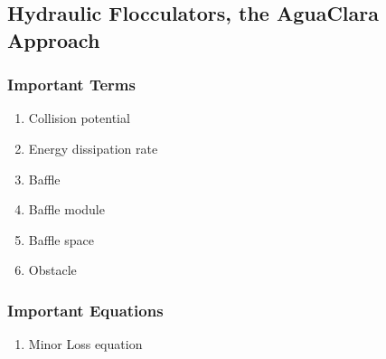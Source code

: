 \documentclass[letterpaper,10pt,english]{sphinxmanual}
\begin{document}
\subsection{Hydraulic Flocculators, the AguaClara Approach}
\label{\detokenize{Flocculation/Floc_Design:hydraulic-flocculators-the-aguaclara-approach}}

\subsubsection{Important Terms}
\label{\detokenize{Flocculation/Floc_Design:important-terms}}\begin{enumerate}
\item {} 
Collision potential

\item {} 
Energy dissipation rate

\item {} 
Baffle

\item {} 
Baffle module

\item {} 
Baffle space

\item {} 
Obstacle

\end{enumerate}


\subsubsection{Important Equations}
\label{\detokenize{Flocculation/Floc_Design:important-equations}}\begin{enumerate}
\item {} 
Minor Loss equation

\end{enumerate}
\end{document}
